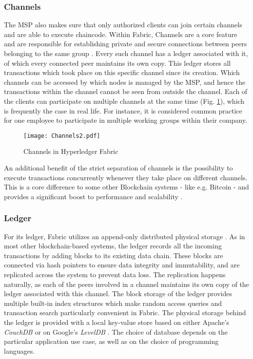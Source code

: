 \subsubsection{Channels}
The MSP also makes sure that only authorized clients can join certain channels and are able to execute chaincode. Within Fabric, Channels are a core feature and are responsible for establishing private and secure connections between peers belonging to the same group \cite[p. 5]{Androulaki2018}. Every such channel has a ledger associated with it, of which every connected peer maintains its own copy. This ledger stores all transactions which took place on this specific channel since its creation. Which channels can be accessed by which nodes is managed by the MSP, and hence the transactions within the channel cannot be seen from outside the channel. Each of the clients can participate on multiple channels at the same time (Fig. \ref{fig:channels}), which is frequently the case in real life. For instance, it is considered common practice for one employee to participate in multiple working groups within their company.

\begin{figure}[ht]
	\centering
	\texttt{[image: Channels2.pdf]}
	\caption{Channels in Hyperledger Fabric}
	\label{fig:channels}
	\vspace{-3mm} %
\end{figure}

An additional benefit of the strict separation of channels is the possibility to execute transactions concurrently whenever they take place on different channels. This is a core difference to some other Blockchain systems - like e.g. Bitcoin - and provides a significant boost to performance and scalability \cite[p. 21]{Matthes2019-2}. 

\subsubsection{Ledger} 
For its ledger, Fabric utilizes an append-only distributed physical storage \cite[pp. 4]{Androulaki2018}. As in most other blockchain-based systems, the ledger records all the incoming transactions by adding blocks to its existing data chain. These blocks are connected via hash pointers to ensure data integrity and immutability, and are replicated across the system to prevent data loss. The replication happens naturally, as each of the peers involved in a channel maintains its own copy of the ledger associated with this channel. The block storage of the ledger provides multiple built-in index structures which make random access queries and transaction search particularly convenient in Fabric. The physical storage behind the ledger is provided with a local key-value store based on either Apache's \textit{CouchDB} \cite{CouchDB} or on Google's \textit{LevelDB} \cite{LevelDB}. The choice of database depends on the particular application use case, as well as on the choice of programming languages. 

